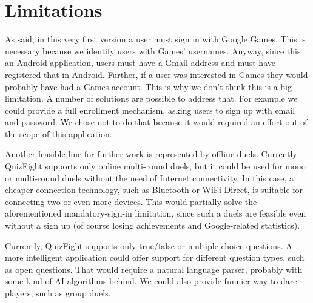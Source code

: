 \section{Limitations}
As said, in this very first version a user must sign in with Google Games. This is necessary because we identify users with Games' usernames. Anyway, since this an Android application, users must have a Gmail address and must have registered that in Android. Further, if a user was interested in Games they would probably have had a Games account. This is why we don't think this is a big limitation. A number of solutions are possible to address that. For example we could provide a full enrollment mechanism, asking users to sign up with email and password. We chose not to do that because it would required an effort out of the scope of this application. 

Another feasible line for further work is represented by offline duels. Currently QuizFight supports only online multi-round duels, but it could be used for mono or multi-round duels without the need of Internet connectivity. In this case, a cheaper connection technology, such as Bluetooth or WiFi-Direct, is suitable for connecting two or even more devices. This would partially solve the aforementioned mandatory-sign-in limitation, since such a duels are feasible even without a sign up (of course losing achievements and Google-related statistics). 

Currently, QuizFight supports only true/false or multiple-choice questions. A more intelligent application could offer support for different question types, such as open questions. That would require a natural language parser, probably with some kind of AI algorithms behind. We could also provide funnier way to dare players, such as group duels.